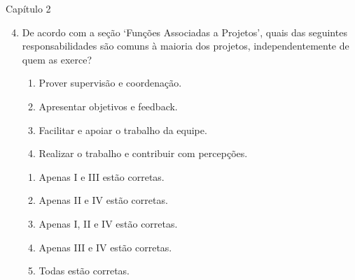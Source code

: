 \documentclass{beamer}
\begin{document}
\begin{frame}{Capítulo 2}
	\begin{enumerate}
		\setcounter{enumi}{3}
		\justifying
		\item De acordo com a seção `Funções Associadas a Projetos', quais das seguintes responsabilidades são comuns à maioria dos projetos, independentemente de quem as exerce?
		
		\begin{enumerate}[I]
			\item Prover supervisão e coordenação.
			\item Apresentar objetivos e feedback.
			\item Facilitar e apoiar o trabalho da equipe.
			\item Realizar o trabalho e contribuir com percepções.
		\end{enumerate}
		
		\vspace{10pt}
		\begin{enumerate}[a]
			\item Apenas I e III estão corretas.
			\item Apenas II e IV estão corretas.
			\item Apenas I, II e IV estão corretas.
			\item Apenas III e IV estão corretas.
			\item \alert<2>{Todas estão corretas}.
		\end{enumerate}
	\end{enumerate}
\end{frame}
\end{document}
